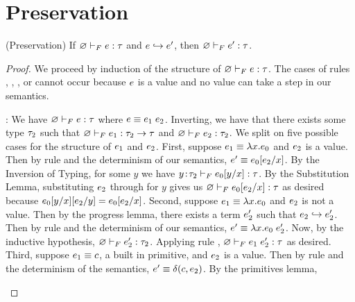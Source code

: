 \section{Preservation}
%
\begin{lemma} (Preservation) \label{lem:preservationF} 
    If $\hasftype{\varnothing}{\sexpr}{\sftype}$ and $\sexpr \step \sexpr'$, 
    then $\hasftype{\varnothing}{\sexpr'}{\sftype}$.
\end{lemma}   

\begin{proof} 
    We proceed by induction of the structure of 
    $\hasftype{\varnothing}{\sexpr}{\sftype}$. The cases of rules
    \fPrim, \fVar, \fAbs, or \fTAbs cannot occur because $\sexpr$ is a value
    and no value can take a step in our semantics.
    \begin{itemize}
    \pfcase{\fApp}: We have 
    $\hasftype{\varnothing}{\sexpr}{\sftype}$ where
    $\sexpr \equiv \app{\sexpr_1}{\sexpr_2}$. 
    Inverting, we have that there exists some type $\sftype_2$
    such that $\hasftype{\varnothing}{\sexpr_1}{\funcftype{\sftype_2}{\sftype}}$
    and $\hasftype{\varnothing}{\sexpr_2}{\sftype_2}$.
    We split on five possible cases for 
    the structure of $\sexpr_1$ and $\sexpr_2$. 
    First, suppose $\sexpr_1 \equiv \vabs{x}{\sexpr_0}$ and $\sexpr_2$ is 
    a value. Then by rule \eAppAbs and the determinism of our semantics, 
    $e' \equiv \subst{\sexpr_0}{x}{\sexpr_2}$.
    By the Inversion of Typing, for some $y$ we have
    $\hasftype{\bind{y}{\sftype_2}}{\subst{\sexpr_0}{x}{y}}{\sftype}$.
    By the Substitution Lemma, substituting $\sexpr_2$ through for $y$
    gives us $\hasftype{\varnothing}{\subst{\sexpr_0}{x}{\sexpr_2}}{\sftype}$
    as desired because $\subst{\subst{\sexpr_0}{x}{y}}{y}{\sexpr_2} = \subst{\sexpr_0}{x}{\sexpr_2}$.
    Second, suppose $\sexpr_1 \equiv \vabs{x}{\sexpr_0}$ and $\sexpr_2$
    is not a value. Then by the progress lemma, there exists a term
    $\sexpr'_2$ such that $\sexpr_2 \step \sexpr'_2$. Then by rule \eAppV
    and the determinism of our semantics,
    $e' \equiv \app{\vabs{x}{\sexpr_0}}{\sexpr'_2}$. 
    Now, by the inductive hypothesis, $\hasftype{\varnothing}{\sexpr'_2}{\sftype_2}$.
    Applying rule \fApp, $\hasftype{\varnothing}{\app{\sexpr_1}{\sexpr'_2}}{\sftype}$
    as desired.
    Third, suppose $\sexpr_1 \equiv \sconst$, a built in primitive, 
    and $\sexpr_2$ is a value. Then by rule \ePrim
    and the determinism of the semantics, 
    $e' \equiv \delta(\sconst,\sexpr_2)$.
    By the primitives lemma, 

\end{itemize}
\end{proof}
